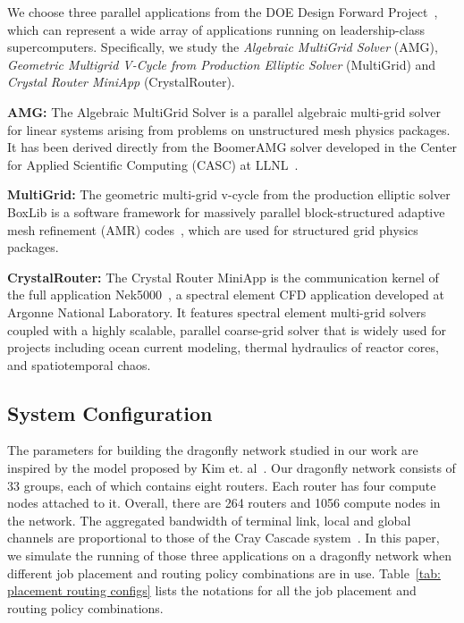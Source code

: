 We choose three parallel applications from the DOE Design Forward Project~\cite{designforwardwebpage}, which can represent a wide array of applications running on leadership-class supercomputers. Specifically, we study the \emph{Algebraic MultiGrid Solver} (AMG), \emph{Geometric Multigrid V-Cycle from Production Elliptic Solver} (MultiGrid) and \emph{Crystal Router MiniApp} (CrystalRouter). 

\textbf{AMG:} The Algebraic MultiGrid Solver is a parallel algebraic multi-grid solver for linear systems arising from problems on unstructured mesh physics packages. It has been derived directly from the BoomerAMG solver developed in the Center for Applied Scientific Computing (CASC) at LLNL~\cite{amg}. 


\textbf{MultiGrid:} The geometric multi-grid v-cycle from the production elliptic solver BoxLib is a software framework for massively parallel block-structured adaptive mesh refinement (AMR) codes~\cite{boxlib}, which are used for structured grid physics packages. 

\textbf{CrystalRouter:} The Crystal Router MiniApp is the communication kernel of the full application Nek5000~\cite{nek5000}, a spectral element CFD application developed at Argonne National Laboratory. It features spectral element multi-grid solvers coupled with a highly scalable, parallel coarse-grid solver that is widely used for projects including ocean current modeling, thermal hydraulics of reactor cores, and spatiotemporal chaos. 




\subsection{System Configuration}
\label{sec: simulation configuration}

The parameters for building the dragonfly network studied in our work are inspired by the model proposed by Kim et. al~\cite{kim-micro}. Our dragonfly network consists of 33 groups, each of which contains eight routers. Each router has four compute nodes attached to it. Overall, there are 264 routers and 1056 compute nodes in the network. The aggregated bandwidth of terminal link,  local and global channels are proportional to those of the Cray Cascade system~\cite{faanes}. In this paper, we simulate the running of those three applications on a dragonfly network when different job placement and routing policy combinations are in use. Table~\ref{tab: placement routing configs} lists the notations for all the job placement and routing policy combinations. 

